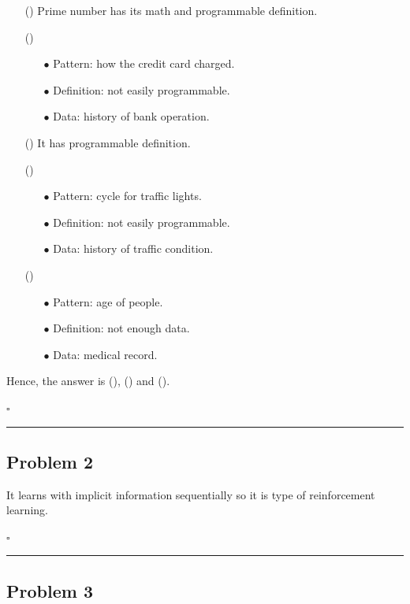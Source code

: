 \documentclass[12pt]{article}
\newcommand{\rmnum}[1]{\romannumeral #1}
\newcommand*{\QEDB}{\hfill\ensuremath{\square}}
\newcommand{\horrule}[1]{\rule{\linewidth}{#1}}
\begin{document}
\begin{enumerate}

\item[(\rmnum{1})] Prime number has its math and programmable definition.

\item[(\rmnum{2})]
\begin{enumerate}
\item[$\bullet$] Pattern: how the credit card charged.
\item[$\bullet$] Definition: not easily programmable.
\item[$\bullet$] Data: history of bank operation.
\end{enumerate}

\item[(\rmnum{3})] It has programmable definition.

\item[(\rmnum{4})]
\begin{enumerate}
\item[$\bullet$] Pattern: cycle for traffic lights.
\item[$\bullet$] Definition: not easily programmable.
\item[$\bullet$] Data: history of traffic condition.
\end{enumerate}

\item[(\rmnum{5})]
\begin{enumerate}
\item[$\bullet$] Pattern: age of people.
\item[$\bullet$] Definition: not enough data.
\item[$\bullet$] Data: medical record.
\end{enumerate}

\end{enumerate}
Hence, the answer is (\rmnum{2}), (\rmnum{4}) and (\rmnum{5}).

\QEDB

\horrule{0.5pt}

\subsection*{Problem 2}

It learns with implicit information sequentially so it is type of reinforcement learning.

\QEDB

\horrule{0.5pt}

\subsection*{Problem 3}
\end{document}
